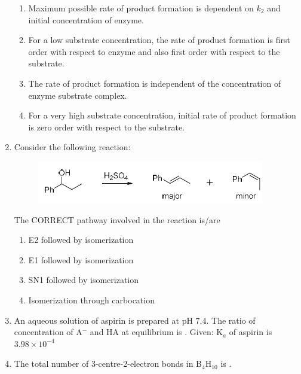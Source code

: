 \documentclass[journal,12pt,onecolumn]{IEEEtran}
\theoremstyle{remark}
\begin{document}
\begin{enumerate}
    \hfill{}
    \begin{enumerate}
        \item Maximum possible rate of product formation is dependent on $k_2$ and initial concentration of enzyme.
        \item For a low substrate concentration, the rate of product formation is first order with respect to enzyme and also first order with respect to the substrate.
        \item The rate of product formation is independent of the concentration of enzyme substrate complex.
        \item For a very high substrate concentration, initial rate of product formation is zero order with respect to the substrate.
    \end{enumerate}

    \item Consider the following reaction:
    \begin{figure}[h!]
        \centering
        \includegraphics[width=0.6\columnwidth]{fig17.png}
        \caption*{}
        \label{fig:q23}
    \end{figure}
    The CORRECT pathway involved in the reaction is/are

    \hfill{}
    \begin{enumerate}
        \item E2 followed by isomerization
        \item E1 followed by isomerization
        \item SN1 followed by isomerization
        \item Isomerization through carbocation
    \end{enumerate}

    \item An aqueous solution of aspirin  is prepared at pH $7.4$. The ratio of concentration of A$^-$ and HA at equilibrium is \underline{\hspace{2cm}} .
    Given: K$_a$ of aspirin is $3.98 \times 10^{-4}$

    \hfill{}

    \item The total number of 3-centre-2-electron bonds in B$_4$H$_{10}$ is \underline{\hspace{2cm}} .


\end{enumerate}
\end{document}
